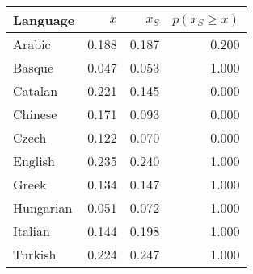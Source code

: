 \begin{tabular}{lrrr}
\toprule
 Language   &   $x$ &   $\overline x_S$ &   $p(x_S \ge x)$ \\
\midrule
 Arabic     & 0.188 &             0.187 &            0.200 \\
 Basque     & 0.047 &             0.053 &            1.000 \\
 Catalan    & 0.221 &             0.145 &            0.000 \\
 Chinese    & 0.171 &             0.093 &            0.000 \\
 Czech      & 0.122 &             0.070 &            0.000 \\
 English    & 0.235 &             0.240 &            1.000 \\
 Greek      & 0.134 &             0.147 &            1.000 \\
 Hungarian  & 0.051 &             0.072 &            1.000 \\
 Italian    & 0.144 &             0.198 &            1.000 \\
 Turkish    & 0.224 &             0.247 &            1.000 \\
\bottomrule
\end{tabular}